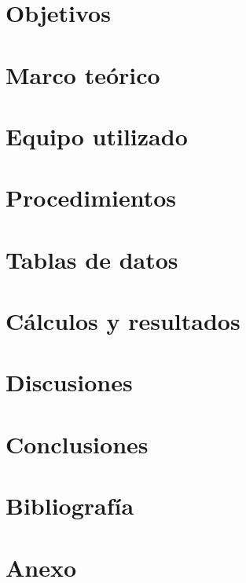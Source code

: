 \documentclass[12pt, a4paper]{article}
\begin{document}


\pagestyle{fancy}
\fancyfoot{} %
\fancyfoot[R]{\thepage}

\tableofcontents
\clearpage

\section{Objetivos}


\section{Marco teórico}


\section{Equipo utilizado}


\section{Procedimientos}


\section{Tablas de datos}


\section{Cálculos y resultados}


\section{Discusiones}


\section{Conclusiones}


\section{Bibliografía}
\printbibliography

\clearpage

\listoffigures
\listoftables

\clearpage

\section{Anexo}
\end{document}
